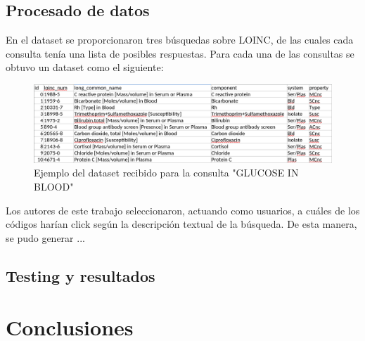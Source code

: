 \documentclass[a4paper,12pt]{article}
\begin{document}
	\subsection{Procesado de datos}
	
	En el dataset se proporcionaron tres búsquedas sobre LOINC, de las cuales cada consulta tenía una lista de posibles respuestas.
	Para cada una de las consultas se obtuvo un dataset como el siguiente:
	
	 \begin{figure}[H]
	 	\centering
	 	\includegraphics[width=\textwidth]{include/query_example_orig.png}
	 	\caption{Ejemplo del dataset recibido para la consulta "GLUCOSE IN BLOOD"}
	 \end{figure}
	
	Los autores de este trabajo seleccionaron, actuando como usuarios, a cuáles de los códigos harían click según la descripción textual de la búsqueda. De esta manera, se pudo generar ... 
	
	
	
	\subsection{Testing y resultados}
	
	\section{Conclusiones}
	

	
	
	
	
\end{document}
